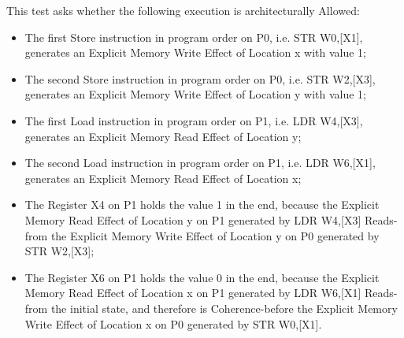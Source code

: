 This test asks whether the following execution is architecturally Allowed:

\begin{itemize}
  \item The first Store instruction in program order on P0, i.e. STR W0,[X1], generates an Explicit Memory Write Effect of Location x with value 1;
  \item The second Store instruction in program order on P0, i.e. STR W2,[X3], generates an Explicit Memory Write Effect of Location y with value 1;
  \item The first Load instruction in program order on P1, i.e. LDR W4,[X3], generates an Explicit Memory Read Effect of Location y;
  \item The second Load instruction in program order on P1, i.e. LDR W6,[X1], generates an Explicit Memory Read Effect of Location x;
  \item The Register X4 on P1 holds the value 1 in the end, because the Explicit Memory Read Effect of Location y on P1 generated by LDR W4,[X3] Reads-from the Explicit Memory Write Effect of Location y on P0 generated by STR W2,[X3];
  \item The Register X6 on P1 holds the value 0 in the end, because the Explicit Memory Read Effect of Location x on P1 generated by LDR W6,[X1] Reads-from the initial state, and therefore is Coherence-before the Explicit Memory Write Effect of Location x on P0 generated by STR W0,[X1].
\end{itemize}
